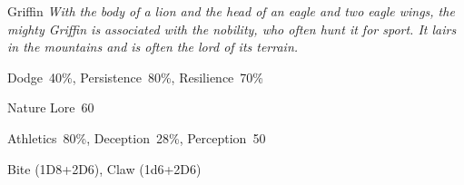 \newpage

\begin{monsterbox}{Griffin}
	\textit{With the body of a lion and the head of an eagle and two eagle wings, the mighty Griffin is associated with the nobility, who often hunt it for sport. It lairs in the mountains and is often the lord of its terrain.}\\
	\rpghline
	\basics[%
        hitpoints  = 25,
	majorwound = 13,
	damagemodifier = +2D6,
	powerpoints = 13,
	movementrate = {23m, 30m when flying},
	armor = Tough Hide (3AP),
	plunderrating = 0
	]
	\rpghline%
	\stats[ %
		STR = 8D6    (28),
		CON = 3D6+12 (22),
		DEX = 3D6+12 (22),
		SIZ = 8D6    (28),
		INT = 6      (6),
		POW = 2D6+6  (13),
		CHA = 7      (7)
	]
	\rpghline%
	\begin{rpg-monsteraction}[Resistances]
		Dodge~40\%, Persistence~80\%, Resilience~70\%
	\end{rpg-monsteraction}
	\begin{rpg-monsteraction}[Knowledge]
		Nature Lore~60%
	\end{rpg-monsteraction}
	\begin{rpg-monsteraction}[Practical]
		Athletics~80\%, Deception~28\%, Perception~50%
	\end{rpg-monsteraction}
	\begin{rpg-monsteraction}
		Bite (1D8+2D6), Claw (1d6+2D6)
	\end{rpg-monsteraction}
\end{monsterbox}

\newpage

